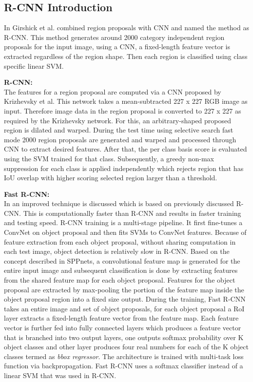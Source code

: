 \subsection{R-CNN Introduction}
In \cite{girshick2014rich} Girshick et al. combined region proposals with CNN and named the method as R-CNN. This method generates around 2000 category independent region proposals for the input image, using a CNN, a fixed-length feature vector is extracted regardless of the region shape. Then each region is classified using class specific linear SVM. 

\newpara \textbf{R-CNN:} \\
The features for a region proposal \cite{girshick2014rich, girshick2015fast, ren2015faster} are computed via a CNN proposed by Krizhevsky et al. This network takes a mean-subtracted 227 x 227 RGB image as input. Therefore image data in the region proposal is converted to 227 x 227 as required by the Krizhevsky network. For this, an arbitrary-shaped  proposed region is dilated and warped. During the test time using selective search fast mode 2000 region proposals are generated and warped and processed through CNN to extract desired features. After that, the per class basis score is evaluated using the SVM trained for that class. Subsequently, a greedy non-max suppression for each class is applied independently which rejects region that has IoU overlap with higher scoring selected region larger than a threshold.

\newpara \textbf{Fast R-CNN:} \\
In \cite{girshick2015fast} an improved technique is discussed which is based on previously discussed R-CNN. This is computationally faster than R-CNN and results in faster training and testing speed. R-CNN training is a multi-stage pipeline. It first fine-tunes a ConvNet on object proposal and then fits SVMs to ConvNet features. Because of feature extraction from each object proposal, without sharing computation in each test image, object detection is relatively slow in R-CNN. Based on the concept described in SPPnets, a convolutional feature map is generated for the entire input image and subsequent classification is done by extracting features from the shared feature map for each object proposal. Features for the object proposal are extracted by max-pooling the portion of the feature map inside the  object proposal region into a fixed size output. During the training, Fast R-CNN takes an entire image and set of object proposals, for each object proposal a RoI layer extracts a fixed-length feature vector from the feature map. Each feature vector is further fed into fully connected layers which produces a feature vector that is branched into two output layers, one outputs softmax probability over K object classes and other layer produces four real numbers for each of the K object classes termed as \textit{bbox regressor}. The architecture is trained with multi-task loss function via backpropagation. Fast R-CNN uses a softmax classifier instead of a linear SVM that was used in R-CNN.

